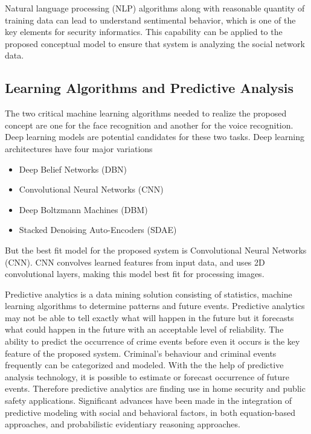 \documentclass[sigconf]{acmart}
\begin{document}
Natural language processing (NLP) algorithms along with reasonable quantity of training data can lead to understand sentimental behavior, which is one of the key elements for security informatics. This capability can be applied to the proposed conceptual model to ensure that system is analyzing the social network data.

\subsection{Learning Algorithms and Predictive Analysis}
The two critical machine learning algorithms needed to realize the proposed concept are one for the face recognition and another for the voice recognition. Deep learning models are potential candidates for these two tasks. Deep learning architectures have four major variations 
\begin{itemize}
 \item Deep Belief Networks (DBN)\cite{Hinton2009}
 \item Convolutional Neural Networks (CNN)\cite{NIPS2012-4824}
 \item Deep Boltzmann Machines (DBM)\cite{pmlr-v9-salakhutdinov10a} 
 \item Stacked Denoising Auto-Encoders (SDAE)\cite{Vincent2010}
 \end{itemize}
 But the best fit model for the proposed system is Convolutional Neural Networks (CNN). CNN convolves learned features from input data, and uses 2D convolutional layers, making this model best fit for processing images.

Predictive analytics is a data mining solution consisting of statistics, machine learning algorithms to determine patterns and future events. Predictive analytics may not be able to tell exactly what will happen in the future but it forecasts what could happen in the future with an acceptable level of reliability\cite{Sanfilippo2012}. The ability to predict the occurrence of crime events before even it occurs is the key feature of the proposed system. Criminal's behaviour and criminal events frequently can be categorized and modeled. With the the help of predictive analysis technology, it is possible to estimate or forecast occurrence of future events. Therefore predictive analytics are finding use in home security and public safety applications. Significant advances have been made in the integration of predictive modeling with social and behavioral factors, in both equation-based approaches, and probabilistic evidentiary reasoning approaches\cite{Sanfilippo2012}. 
\end{document}
